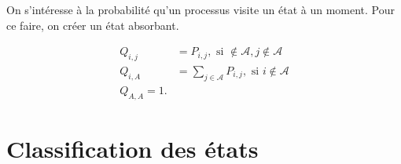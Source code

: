 On s'intéresse à la probabilité qu'un processus visite un état à un moment. Pour ce faire, on créer un état absorbant.  

\begin{align*}
Q_{i,j} &= P_{i,j}, \text{ si } \notin \mathcal{A}, j\notin \mathcal{A}\\
Q_{i,A} &= \sum_{j\in \mathcal{A}} P_{i,j}, \text{ si } i\notin \mathcal{A}\\
Q_{A, A} = 1.
\end{align*}

\section{Classification des états}


















